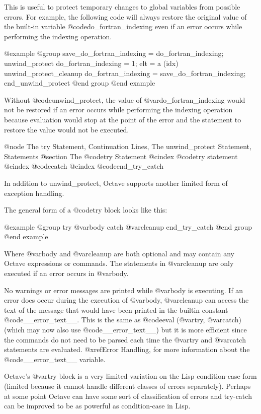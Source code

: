 This is useful to protect temporary changes to global variables from
possible errors.  For example, the following code will always restore
the original value of the built-in variable @code{do_fortran_indexing}
even if an error occurs while performing the indexing operation.

@example
@group
save_do_fortran_indexing = do_fortran_indexing;
unwind_protect
  do_fortran_indexing = 1;
  elt = a (idx)
unwind_protect_cleanup
  do_fortran_indexing = save_do_fortran_indexing;
end_unwind_protect
@end group
@end example

Without @code{unwind_protect}, the value of @var{do_fortran_indexing}
would not be restored if an error occurs while performing the indexing
operation because evaluation would stop at the point of the error and
the statement to restore the value would not be executed.

@node The try Statement, Continuation Lines, The unwind_protect Statement, Statements
@section The @code{try} Statement
@cindex @code{try} statement
@cindex @code{catch}
@cindex @code{end_try_catch}

In addition to unwind_protect, Octave supports another limited form of
exception handling.

The general form of a @code{try} block looks like this:

@example
@group
try
  @var{body}
catch
  @var{cleanup}
end_try_catch
@end group
@end example

Where @var{body} and @var{cleanup} are both optional and may contain any
Octave expressions or commands.  The statements in @var{cleanup} are
only executed if an error occurs in @var{body}.

No warnings or error messages are printed while @var{body} is
executing.  If an error does occur during the execution of @var{body},
@var{cleanup} can access the text of the message that would have been
printed in the builtin constant @code{__error_text__}.  This is the same
as @code{eval (@var{try}, @var{catch})} (which may now also use
@code{__error_text__}) but it is more efficient since the commands do
not need to be parsed each time the @var{try} and @var{catch} statements
are evaluated.  @xref{Error Handling}, for more information about the
@code{__error_text__} variable.

Octave's @var{try} block is a very limited variation on the Lisp
condition-case form (limited because it cannot handle different classes
of errors separately).  Perhaps at some point Octave can have some sort
of classification of errors and try-catch can be improved to be as
powerful as condition-case in Lisp.

